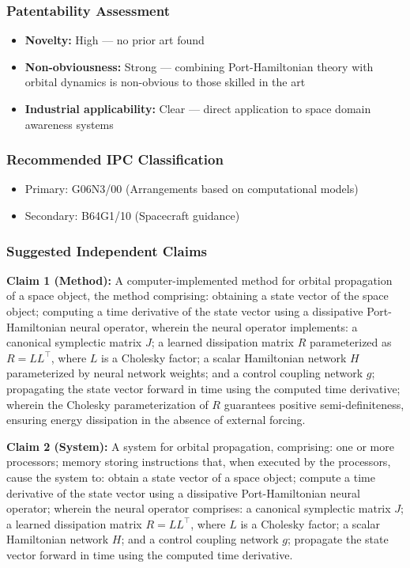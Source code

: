 \documentclass[11pt,a4paper]{article}
\begin{document}
\subsubsection*{Patentability Assessment}
\begin{itemize}
\item \textbf{Novelty:} High — no prior art found
\item \textbf{Non-obviousness:} Strong — combining Port-Hamiltonian theory with orbital dynamics is non-obvious to those skilled in the art
\item \textbf{Industrial applicability:} Clear — direct application to space domain awareness systems
\end{itemize}

\subsubsection*{Recommended IPC Classification}
\begin{itemize}
\item Primary: G06N3/00 (Arrangements based on computational models)
\item Secondary: B64G1/10 (Spacecraft guidance)
\end{itemize}

\subsubsection*{Suggested Independent Claims}

\textbf{Claim 1 (Method):} A computer-implemented method for orbital propagation of a space object, the method comprising: obtaining a state vector of the space object; computing a time derivative of the state vector using a dissipative Port-Hamiltonian neural operator, wherein the neural operator implements: a canonical symplectic matrix $J$; a learned dissipation matrix $R$ parameterized as $R = LL^\top$, where $L$ is a Cholesky factor; a scalar Hamiltonian network $H$ parameterized by neural network weights; and a control coupling network $g$; propagating the state vector forward in time using the computed time derivative; wherein the Cholesky parameterization of $R$ guarantees positive semi-definiteness, ensuring energy dissipation in the absence of external forcing.

\textbf{Claim 2 (System):} A system for orbital propagation, comprising: one or more processors; memory storing instructions that, when executed by the processors, cause the system to: obtain a state vector of a space object; compute a time derivative of the state vector using a dissipative Port-Hamiltonian neural operator; wherein the neural operator comprises: a canonical symplectic matrix $J$; a learned dissipation matrix $R = LL^\top$, where $L$ is a Cholesky factor; a scalar Hamiltonian network $H$; and a control coupling network $g$; propagate the state vector forward in time using the computed time derivative.
\end{document}
